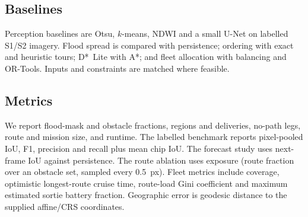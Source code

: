 \begin{table}[t]
\centering
\caption{Pipeline configuration used in all experiments (repository defaults). The multi-base experiment additionally uses a moderate weather preset (3 mm, 12 km/h, 270$^\circ$).}
\label{tab:config}
\footnotesize
\setlength{\tabcolsep}{3pt}
\end{table}

\subsection{Baselines}
Perception baselines are Otsu, $k$-means, NDWI and a small U-Net on labelled S1/S2 imagery. Flood spread is compared with persistence; ordering with exact and heuristic tours; D*~Lite with A*; and fleet allocation with balancing and OR-Tools. Inputs and constraints are matched where feasible.

\subsection{Metrics}
We report flood-mask and obstacle fractions, regions and deliveries, no-path legs, route and mission size, and runtime. The labelled benchmark reports pixel-pooled IoU, F1, precision and recall plus mean chip IoU. The forecast study uses next-frame IoU against persistence. The route ablation uses exposure (route fraction over an obstacle set, sampled every 0.5~px). Fleet metrics include coverage, optimistic longest-route cruise time, route-load Gini coefficient and maximum estimated sortie battery fraction. Geographic error is geodesic distance to the supplied affine/CRS coordinates.

